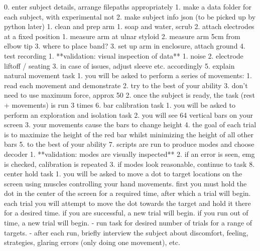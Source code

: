 \documentclass[../main.tex]{subfiles}
\begin{document}
0. enter subject details, arrange filepaths appropriately
   1. make a data folder for each subject, with experimental not
   2. make subject info json (to be picked up by python later)
1. clean and prep arm
   1. soap and water, scrub
2. attach electrodes at a fixed position
   1. measure arm at ulnar styloid
   2. measure arm 5cm from elbow tip
   3. where to place band?
3. set up arm in enclosure, attach ground
4. test recording
   1. **validation: visual inspection of data**
      1. noise
      2. electrode liftoff / seating
      3. in case of issues, adjust sleeve etc. accordingly
5. explain natural movement task
   1. you will be asked to perform a series of movements:
      1. read each movement and demonstrate
      2. try to the best of your ability
      3. don't need to use maximum force, approx 50%
   2. once the subject is ready, the task (rest + movements) is run 3 times
6. bar calibration task
   1. you will be asked to perform an exploration and isolation task
   2. you will see 64 vertical bars on your screen
   3. your movements cause the bars to change height
   4. the goal of each trial is to maximize the height of the red bar whilst minimizing the height of all other bars
   5. to the best of your ability
7. scripts are run to produce modes and choose decoder
   1. **validation: modes are visually inspected**
   2. if an error is seen, emg is checked, calibration is repeated
   3. if modes look reasonable, continue to task
8. center hold task
   1. you will be asked to move a dot to target locations on the screen using muscles controlling your hand movements. first you must hold the dot in the center of the screen for a required time, after which a trial will begin. each trial you will attempt to move the dot towards the target and hold it there for a desired time. if you are successful, a new trial will begin. if you run out of time, a new trial will begin.
- run task for desired number of trials for a range of targets.
- after each run, briefly interview the subject about discomfort, feeling, strategies, glaring errors (only doing one movement), etc.
\end{document}
